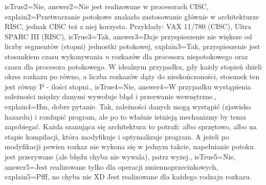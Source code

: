 \begin{enumerate}
\begin{minipage}{\textwidth}
{		isTrue2={Nie},%
		answer2={Nie jest realizowane w procesorach CISC},%
		explain2={Przetwarzanie potokowe znalazło zastosowanie głównie w architekturze RISC, jednak CISC też z niej korzysta. Przykłady: VAX 11/780 (CISC), Ultra SPARC III (RISC)},%
		isTrue3={Tak},%
		answer3={Daje przyspieszenie nie większe od liczby segmentów (stopni) jednostki potokowej},%
		explain3={Tak, przyspieszenie jest stosunkiem czasu wykonywania \emph{n} rozkazów dla procesora niepotokowego oraz czasu dla procesora potokowego. W idealnym przypadku, gdy każdy stopień dzieli okres rozkazu po równo, a liczba rozkazów dąży do nieskończoności, stosunek ten jest równy P - ilości stopni.},%
		isTrue4={Nie},%
		answer4={W przypadku wystąpienia zależności między danymi wywołuje błąd i przerwanie wewnętrzne.},%
		explain4={Hm, dobre pytanie. Tak, zależności danych mogą wystąpić (zjawisko hazardu) i rozdupić program, ale po to właśnie istnieją mechanizmy by temu zapobiegać. Każda szanująca się architektura to potrafi: albo sprzętowo, albo na etapie kompilacji, która modyfikuje i optymalizuje program. A jeżeli po modyfikacji pewien rozkaz nie wykona się w jednym takcie, napełnianie potoku jest przerywane (ale błędu chyba nie wywala), patrz wyżej.},%
		isTrue5={Nie},%
		answer5={Jest realizowane tylko dla operacji zmiennoprzecinkowych}, %
		explain5={Pfff, no chyba nie XD Jest realizowane dla każdego rodzaju rozkazu.} %
	}
\end{minipage}
\begin{minipage}{\textwidth}
\end{minipage}
\end{enumerate}
